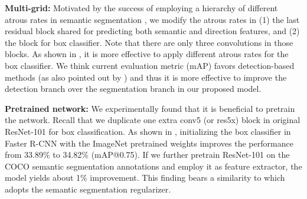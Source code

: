 \textbf{Multi-grid:} Motivated by the success of employing a hierarchy of different atrous rates in semantic segmentation \cite{wang2017understanding, dai2017deformable, chen2017rethinking}, we modify the atrous rates in (1) the last residual block shared for predicting both semantic and direction features, and (2) the block for box classifier. Note that there are only three convolutions in those blocks. As shown in , it is more effective to apply different atrous rates for the box classifier. We think current evaluation metric (mAP) favors detection-based methods (as also pointed out by \cite{bai2017deep}) and thus it is more effective to improve the detection branch over the segmentation branch in our proposed model.

\begin{table}[!t]
  \centering
  \caption{Multi-grid performance (mAP@0.75). Within the parentheses, we show the three atrous rates used for the three convolutions in the residual block. It is effective to adopt different atrous rates for the box classifier. Further marginal improvement is obtained when we also change the atrous rates in the last block that is shared by semantic segmentation and direction prediction logits.}
  \label{tab:multi_grid}
\end{table}



\textbf{Pretrained network:} We experimentally found that it is beneficial to pretrain the network. Recall that we duplicate one extra conv5 (or res5x) block in original ResNet-101 for box classification. As shown in , initializing the box classifier in Faster R-CNN with the ImageNet pretrained weights improves the performance from 33.89\% to 34.82\% (mAP@0.75). If we further pretrain ResNet-101 on the COCO semantic segmentation annotations and employ it as feature extractor, the model yields about 1\% improvement. This finding bears a similarity to \cite{bell2016inside} which adopts the semantic segmentation regularizer.

